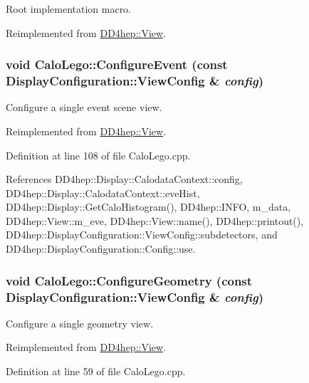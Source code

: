 Root implementation macro. 

Reimplemented from \hyperlink{class_d_d4hep_1_1_view_a35dcb8a29c90f0adeba81ad4215be551}{DD4hep::View}.\hypertarget{class_d_d4hep_1_1_calo_lego_a997e3fea32d37374ef4c6c95e087af9c}{
\subsubsection[{ConfigureEvent}]{\setlength{\rightskip}{0pt plus 5cm}void CaloLego::ConfigureEvent (const {\bf DisplayConfiguration::ViewConfig} \& {\em config})}}
\label{class_d_d4hep_1_1_calo_lego_a997e3fea32d37374ef4c6c95e087af9c}


Configure a single event scene view. 

Reimplemented from \hyperlink{class_d_d4hep_1_1_view_a655dc004a93ab9caa56ee5a501bf492f}{DD4hep::View}.

Definition at line 108 of file CaloLego.cpp.

References DD4hep::Display::CalodataContext::config, DD4hep::Display::CalodataContext::eveHist, DD4hep::Display::GetCaloHistogram(), DD4hep::INFO, m\_\-data, DD4hep::View::m\_\-eve, DD4hep::View::name(), DD4hep::printout(), DD4hep::DisplayConfiguration::ViewConfig::subdetectors, and DD4hep::DisplayConfiguration::Config::use.\hypertarget{class_d_d4hep_1_1_calo_lego_aca92ae6d2fe4e24a928fa23dbe755d19}{
\subsubsection[{ConfigureGeometry}]{\setlength{\rightskip}{0pt plus 5cm}void CaloLego::ConfigureGeometry (const {\bf DisplayConfiguration::ViewConfig} \& {\em config})}}
\label{class_d_d4hep_1_1_calo_lego_aca92ae6d2fe4e24a928fa23dbe755d19}


Configure a single geometry view. 

Reimplemented from \hyperlink{class_d_d4hep_1_1_view_adefb4cb817819ec62803d34b89bf0988}{DD4hep::View}.

Definition at line 59 of file CaloLego.cpp.

